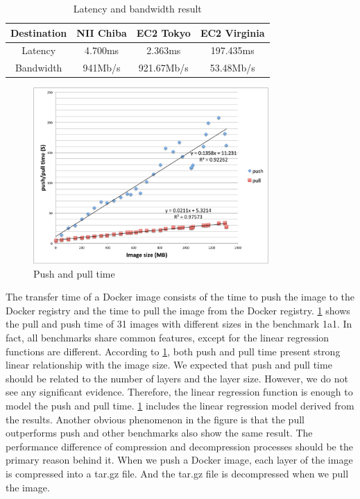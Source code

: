 \documentclass{ieicej}
\begin{document}
\begin{table}
  \begin{tabular}{|c|c|c|c|}
    \hline
    Destination & NII Chiba      & EC2 Tokyo    & EC2 Virginia \\
    \hline
    Latency     & 4.700ms        & 2.363ms      & 197.435ms \\
    \hline
    Bandwidth   & 941Mb/s        & 921.67Mb/s   & 53.48Mb/s \\
    \hline
  \end{tabular}
  \caption{Latency and bandwidth result}
  \label{lat_band}
\end{table}


\begin{figure}
  \begin{center}
  \includegraphics[width=0.8\textwidth,natwidth=1000,natheight=800]{4_push_and_pull_time.pdf}
  \end{center}
  \caption{Push and pull time}
  \label{ppt}
\end{figure}

The transfer time of a Docker image consists of the time to push the image to the Docker registry and the time to pull the image from the Docker registry.
\cref{ppt} shows the pull and push time of 31 images with different sizes in the benchmark 1a1.
In fact, all benchmarks share common features, except for the linear regression functions are different.
According to \cref{ppt}, both push and pull time present strong linear relationship with the image size.
We expected that push and pull time should be related to the number of layers and the layer size.
However, we do not see any significant evidence. Therefore, the linear regression function is enough to model the push and pull time.
\cref{ppt} includes the linear regression model derived from the results. Another obvious phenomenon in the figure is that the pull outperforms push and other benchmarks also show the same result.
The performance difference of compression and decompression processes should be the primary reason behind it.
When we push a Docker image, each layer of the image is compressed into a tar.gz file.
And the tar.gz file is decompressed when we pull the image.
\end{document}
